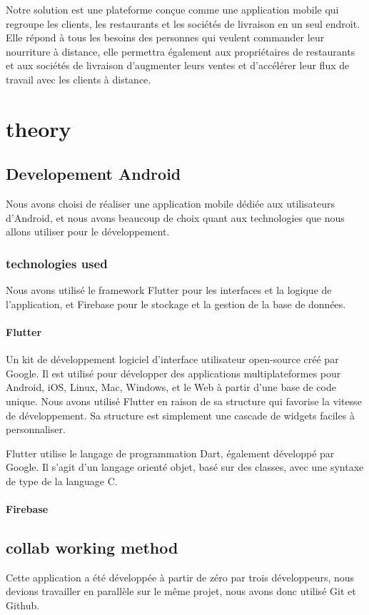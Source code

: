 \documentclass[a4paper, 10p]{report}
\begin{document}
Notre solution est une plateforme conçue comme une application mobile qui regroupe les clients, les restaurants et les sociétés de livraison en un seul endroit. Elle répond à tous les besoins des personnes qui veulent commander leur nourriture à distance, elle permettra également aux propriétaires de restaurants et aux sociétés de livraison d'augmenter leurs ventes et d'accélérer leur flux de travail avec les clients à distance.

\newpage
\chapter{theory}
	\section{Developement Android} Nous avons choisi de réaliser une application mobile dédiée aux utilisateurs d'Android, et nous avons beaucoup de choix quant aux technologies que nous allons utiliser pour le développement.
		\subsection{technologies used} Nous avons utilisé le framework Flutter pour les interfaces et la logique de l'application, et Firebase pour le stockage et la gestion de la base de données.
		
			\subsubsection*{Flutter} Un kit de développement logiciel d'interface utilisateur open-source créé par Google. Il est utilisé pour développer des applications multiplateformes pour Android, iOS, Linux, Mac, Windows, et le Web à partir d'une base de code unique.
Nous avons utilisé Flutter en raison de sa structure qui favorise la vitesse de développement. Sa structure est simplement une cascade de widgets faciles à personnaliser.

Flutter utilise le langage de programmation Dart, également développé par Google. Il s'agit d'un langage orienté objet, basé sur des classes, avec une syntaxe de type de la language C.
			\subsubsection*{Firebase}
	\section{collab working method}
		Cette application a été développée à partir de zéro par trois développeurs, nous devions travailler en parallèle sur le même projet, nous avons donc utilisé Git et Github.
\end{document}
